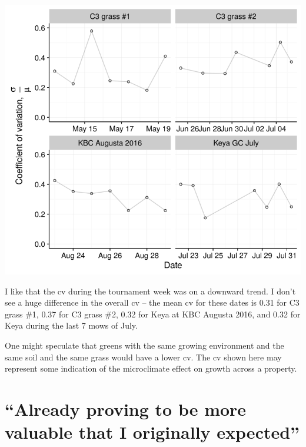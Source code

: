 \documentclass[12pt,b5,]{tufte-book}
\begin{document}
\includegraphics{img/b3-3.png}

I like that the cv during the tournament week was on a downward trend. I don't see a huge difference in the overall cv -- the mean cv for these dates is 0.31 for C3 grass \#1, 0.37 for C3 grass \#2, 0.32 for Keya at KBC Augusta 2016, and 0.32 for Keya during the last 7 mows of July.

One might speculate that greens with the same growing environment and the same soil and the same grass would have a lower cv. The cv shown here may represent some indication of the microclimate effect on growth across a property.

\hypertarget{already-proving-to-be-more-valuable-that-i-originally-expected}{%
\chapter{``Already proving to be more valuable that I originally expected''}\label{already-proving-to-be-more-valuable-that-i-originally-expected}}
\end{document}
